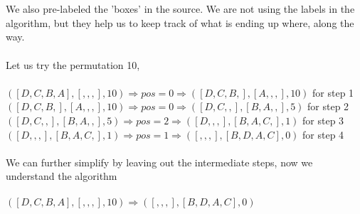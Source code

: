 \documentclass{article} %
\begin{document}
\\
\\
\noindent We also pre-labeled the 'boxes' in the source. We are not using the labels in the algorithm, but they help us to keep track of what is ending up where, along the way. 
\\
\\
Let us try the permutation 10,
\\
\\
\(   ( [D,C,B,A], [, , , ], 10)    \Rightarrow  pos = 0  \Rightarrow  ( [D,C,B,], [A, , , ], 10)    \)  for step 1
\\
\(  ( [D,C,B,], [A, , , ], 10)     \Rightarrow  pos = 0 \Rightarrow  ( [D,C,,], [B, A, , ], 5)    \) for step 2
\\
\(   ( [D,C,,], [B, A, , ], 5)     \Rightarrow  pos = 2 \Rightarrow  ( [D,,,], [B ,A ,C, ], 1)   \) for step 3
\\
\(  ( [D,,,], [B ,A ,C, ], 1)     \Rightarrow  pos = 1 \Rightarrow  ( [,,,], [B ,D, A, C ], 0)    \) for step 4
\\
\\
We can further simplify by leaving out the intermediate steps, now we understand the algorithm
\\
\\
\(   ( [D,C,B,A], [, , , ], 10)    \Rightarrow  ( [,,,], [B ,D, A, C ], 0)    \) 
\newpage
\end{document}
